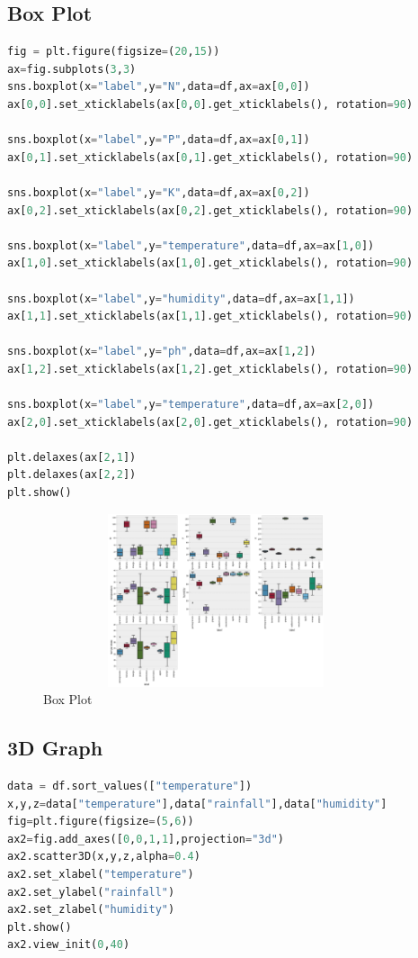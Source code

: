 \subsection{Box Plot}
\begin{lstlisting}[language=Python,basicstyle=\fontsize{9}{11}\selectfont]
fig = plt.figure(figsize=(20,15))
ax=fig.subplots(3,3)
sns.boxplot(x="label",y="N",data=df,ax=ax[0,0])
ax[0,0].set_xticklabels(ax[0,0].get_xticklabels(), rotation=90)

sns.boxplot(x="label",y="P",data=df,ax=ax[0,1])
ax[0,1].set_xticklabels(ax[0,1].get_xticklabels(), rotation=90)

sns.boxplot(x="label",y="K",data=df,ax=ax[0,2])
ax[0,2].set_xticklabels(ax[0,2].get_xticklabels(), rotation=90)

sns.boxplot(x="label",y="temperature",data=df,ax=ax[1,0])
ax[1,0].set_xticklabels(ax[1,0].get_xticklabels(), rotation=90)

sns.boxplot(x="label",y="humidity",data=df,ax=ax[1,1])
ax[1,1].set_xticklabels(ax[1,1].get_xticklabels(), rotation=90)

sns.boxplot(x="label",y="ph",data=df,ax=ax[1,2])
ax[1,2].set_xticklabels(ax[1,2].get_xticklabels(), rotation=90)

sns.boxplot(x="label",y="temperature",data=df,ax=ax[2,0])
ax[2,0].set_xticklabels(ax[2,0].get_xticklabels(), rotation=90)

plt.delaxes(ax[2,1])
plt.delaxes(ax[2,2])
plt.show()
\end{lstlisting}
 
\begin{figure}[h]
\centering
 \footnotesize
 \includegraphics[width=4in,height=2in]{boxplot.png}
\caption{Box Plot}
\label{fig:unevenlight}
\end{figure} 
\subsection{3D Graph}
\begin{lstlisting}[language=Python,basicstyle=\fontsize{9}{11}\selectfont]
data = df.sort_values(["temperature"])
x,y,z=data["temperature"],data["rainfall"],data["humidity"]
fig=plt.figure(figsize=(5,6))
ax2=fig.add_axes([0,0,1,1],projection="3d")
ax2.scatter3D(x,y,z,alpha=0.4)
ax2.set_xlabel("temperature")
ax2.set_ylabel("rainfall")
ax2.set_zlabel("humidity")
plt.show()
ax2.view_init(0,40)
\end{lstlisting}
 
